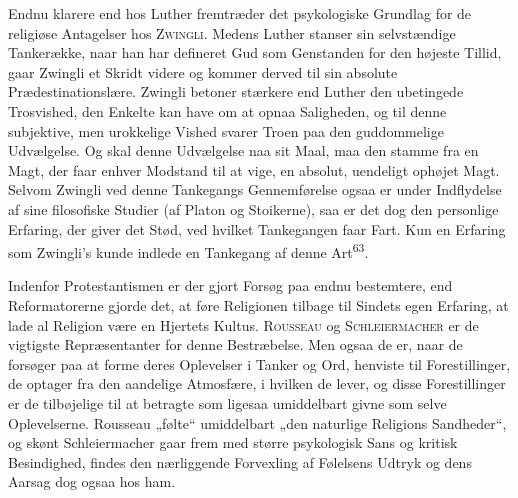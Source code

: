 \documentclass[12pt,a4paper,openany]{book}
\begin{document}
Endnu klarere end hos Luther fremtræder det psykologiske Grundlag for de
religiøse Antagelser hos \textsc{Zwingli}. Medens Luther stanser sin
selvstændige Tankerække, naar han har defineret Gud som Genstanden for
den højeste Tillid, gaar Zwingli et Skridt videre og kommer derved til
sin absolute Prædestinationslære. Zwingli betoner stærkere end Luther
den ubetingede Trosvished, den Enkelte kan have om at opnaa Saligheden,
og til denne subjektive, men urokkelige Vished svarer Troen paa den
guddommelige Udvælgelse. Og skal denne Udvælgelse naa sit Maal, maa den
stamme fra en Magt, der faar enhver Modstand til at vige, en absolut,
uendeligt ophøjet Magt. Selvom Zwingli ved denne Tankegangs
Gennemførelse ogsaa er under Indflydelse af sine filosofiske Studier (af
Platon og Stoikerne), saa er det dog den personlige Erfaring, der giver
det Stød, ved hvilket Tankegangen faar Fart. Kun en Erfaring som
Zwingli’s kunde indlede en Tankegang af denne Art\textsuperscript{63}.

Indenfor Protestantismen er der gjort Forsøg paa endnu bestemtere, end
Reformatorerne gjorde det, at føre Religionen tilbage til Sindets egen
Erfaring, at lade al Religion være en Hjertets Kultus. \textsc{Rousseau}
og \textsc{Schleiermacher} er de vigtigste Repræsentanter for denne
Bestræbelse. Men ogsaa de er, naar de forsøger paa at forme deres
Oplevelser i Tanker og Ord, henviste til Forestillinger, de optager fra
den aandelige Atmosfære, i hvilken de lever, og disse Forestillinger er
de tilbøjelige til at betragte som ligesaa umiddelbart givne som selve
Oplevelserne. Rousseau „følte“ umiddelbart „den naturlige Religions
Sandheder“, og skønt Schleiermacher gaar frem med større psykologisk
Sans og kritisk Besindighed, findes den nærliggende Forvexling af
Følelsens Udtryk og dens Aarsag dog ogsaa hos ham.
\end{document}
